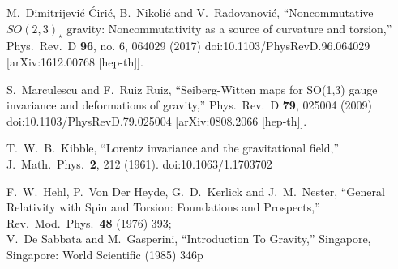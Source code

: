 \documentclass[11pt]{article}
\numberwithin{equation}{section}
\begin{document}
\begin{thebibliography}{99}
M.~Dimitrijević Ćirić, B.~Nikolić and V.~Radovanović,
``Noncommutative $SO(2,3)_\star$ gravity: Noncommutativity as a source of curvature and torsion,''
Phys.\ Rev.\ D {\bf 96}, no. 6, 064029 (2017)
doi:10.1103/PhysRevD.96.064029
[arXiv:1612.00768 [hep-th]].

  S.~Marculescu and F.~Ruiz Ruiz,
  ``Seiberg-Witten maps for SO(1,3) gauge invariance and deformations of gravity,''
  Phys.\ Rev.\ D {\bf 79}, 025004 (2009)
  doi:10.1103/PhysRevD.79.025004
  [arXiv:0808.2066 [hep-th]].


  T.~W.~B.~Kibble,
  ``Lorentz invariance and the gravitational field,''
  J.\ Math.\ Phys.\  {\bf 2}, 212 (1961).
  doi:10.1063/1.1703702

  F.~W.~Hehl, P.~Von Der Heyde, G.~D.~Kerlick and J.~M.~Nester,
  ``General Relativity with Spin and Torsion: Foundations and Prospects,''
  Rev.\ Mod.\ Phys.\  {\bf 48} (1976) 393;\\
  V.~De Sabbata and M.~Gasperini,
  ``Introduction To Gravity,''
  Singapore, Singapore: World Scientific (1985) 346p

\end{thebibliography}

 
\end{document}
